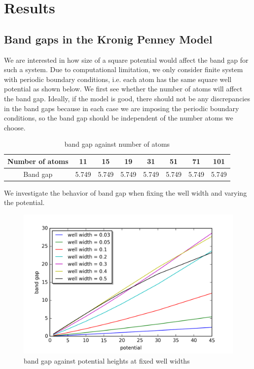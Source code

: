 \chapter{Results}\label{Ch:Results}

\section{Band gaps in the Kronig Penney Model}

We are interested in how size of a square potential would affect the band gap for such a system. Due to computational limitation, we only consider finite system with periodic boundary conditions, i.e. each atom has the same square well potential as shown below.
We first see whether the number of atoms will affect the band gap. Ideally, if the model is good, there should not be any discrepancies in the band gaps because in each case we are imposing the periodic boundary conditions, so the band gap should be independent of the number atoms we choose. 
\begin{table}[h]
\centering
\begin{tabular}{ c|c|c|c|c|c|c|c } 
 Number of atoms & 11 & 15 & 19& 31 & 51 & 71& 101 \\ 
 \hline
 Band gap & 5.749 & 5.749 & 5.749& 5.749 & 5.749 & 5.749& 5.749\\ 
\end{tabular}
\caption{band gap against number of atoms}
\label{tab:num of atoms vs band gap}
\centering
\end{table}

\newpage
We investigate the behavior of band gap when fixing the well width and varying the potential. 

\begin{figure}[h]
\centering
\includegraphics[scale=.8]{Bandgap/30_change_Potentials.png}
\caption{band gap against potential heights at fixed well widths}
\label{fig: band gap against potential }
\end{figure}

